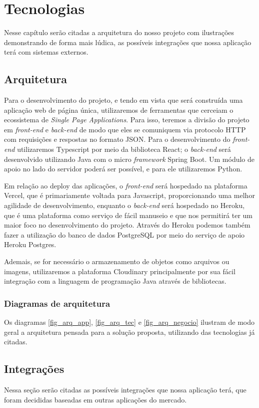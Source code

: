 \chapter{Tecnologias}
Nesse capítulo serão citadas a arquitetura do nosso projeto com ilustrações demonstrando de forma mais lúdica, as possíveis integrações que nossa aplicação terá com sistemas externos.

\section{Arquitetura}
Para o desenvolvimento do projeto, e tendo em vista que será construída uma aplicação web de página única, utilizaremos de ferramentas que cerceiam o ecossistema de \textit{Single Page Applications}. Para isso, teremos a divisão do projeto em \textit{front-end} e \textit{back-end} de modo que eles se comuniquem via protocolo HTTP com requisições e respostas no formato JSON. Para o desenvolvimento do \textit{front-end} utilizaremos Typescript por meio da biblioteca React; o \textit{back-end} será desenvolvido utilizando Java com o micro \textit{framework} Spring Boot. Um módulo de apoio no lado do servidor poderá ser possível, e para ele utilizaremos Python. 

Em relação ao deploy das aplicações, o \textit{front-end} será hospedado na plataforma Vercel, que é primariamente voltada para Javascript, proporcionando uma melhor agilidade de desenvolvimento, enquanto o \textit{back-end} será hospedado no Heroku, que é uma plataforma como serviço de fácil manuseio e que nos permitirá ter um maior foco no desenvolvimento do projeto. Através do Heroku podemos também fazer a utilização do banco de dados PostgreSQL por meio do serviço de apoio Heroku Postgres.

Ademais, se for necessário o armazenamento de objetos como arquivos ou imagens, utilizaremos a plataforma Cloudinary principalmente por sua fácil integração com a linguagem de programação Java através de bibliotecas.


\subsection{Diagramas de arquitetura}
Os diagramas \autoref{fig_arq_app}, \autoref{fig_arq_tec} e \autoref{fig_arq_negocio} ilustram de modo geral a arquitetura pensada para a solução proposta, utilizando das tecnologias já citadas.

\section{Integrações}
Nessa seção serão citadas as possíveis integrações que nossa aplicação terá, que foram decididas baseadas em outras aplicações do mercado.

